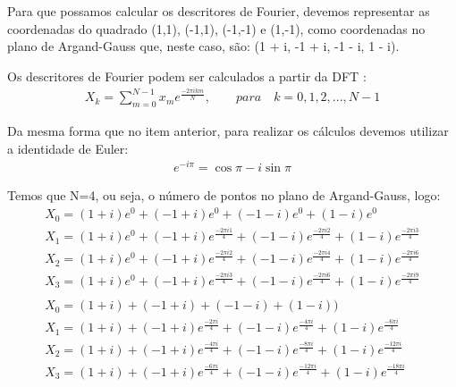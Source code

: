 \documentclass[12pt]{article}
\begin{document}
\begin{itemize}
\begin{itemize}
Para que possamos calcular os descritores de Fourier, devemos representar as coordenadas do quadrado (1,1), (-1,1), (-1,-1) e (1,-1), como 
coordenadas no plano de Argand-Gauss que, neste caso, são: (1 + i, -1 + i, -1 - i, 1 - i).

Os descritores de Fourier podem ser calculados a partir da DFT \cite{broughton2009discrete}:
\begin{align*}
    X_k = \sum\limits_{m=0}^{N-1} x_m e^{\frac{-2\pi ikm}{N}},\qquad para\quad k=0,1,2,...,N-1
\end{align*}

Da mesma forma que no item anterior, para realizar os cálculos devemos utilizar a identidade de Euler:
\begin{align*}
    e^{-i \pi} = \cos \pi - i\sin\pi
\end{align*}
	  
Temos que N=4, ou seja, o número de pontos no plano de Argand-Gauss, logo:
\begin{align*}
    &X_0 = (1 + i)e^0 + (-1 + i)e^0 + (-1 - i)e^0 + (1 - i)e^0 &\\
    &X_1 = (1 + i)e^0 + (-1 + i)e^{\frac{-2\pi i1}{4}} + (-1 - i)e^{\frac{-2\pi i2}{4}} + (1 - i)e^{\frac{-2\pi i3}{4}} &\\
    &X_2 = (1 + i)e^0 + (-1 + i)e^{\frac{-2\pi i2}{4}} + (-1 - i)e^{\frac{-2\pi i4}{4}} + (1 - i)e^{\frac{-2\pi i6}{4}} &\\
    &X_3 = (1 + i)e^0 + (-1 + i)e^{\frac{-2\pi i3}{4}} + (-1 - i)e^{\frac{-2\pi i6}{4}} + (1 - i)e^{\frac{-2\pi i9}{4}} &\\
    \\
    &X_0 = (1 + i) + (-1 + i) + (-1 - i) + (1 - i)) &\\
    &X_1 = (1 + i) + (-1 + i)e^{\frac{-2\pi i}{4}} + (-1 - i)e^{\frac{-4\pi i}{4}} + (1 - i)e^{\frac{-6\pi i}{4}} &\\
    &X_2 = (1 + i) + (-1 + i)e^{\frac{-4\pi i}{4}} + (-1 - i)e^{\frac{-8\pi i}{4}} + (1 - i)e^{\frac{-12\pi i}{4}} &\\
    &X_3 = (1 + i) + (-1 + i)e^{\frac{-6\pi i}{4}} + (-1 - i)e^{\frac{-12\pi i}{4}} + (1 - i)e^{\frac{-18\pi i}{4}} &
\end{align*}


\end{itemize}
\end{itemize}
\end{document}
